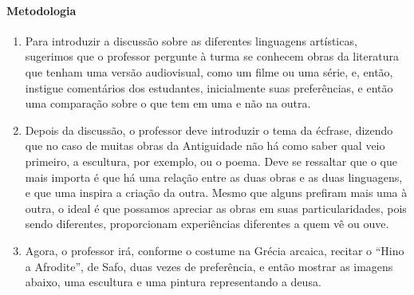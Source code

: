 \documentclass[12pt]{extarticle}
\begin{document}

\paragraph{Metodologia} 

\begin{enumerate}
\item
Para introduzir a discussão sobre as diferentes linguagens artísticas, sugerimos
que o professor pergunte à turma se conhecem obras da literatura que tenham
uma versão audiovisual, como um filme ou uma série, e, então, instigue comentários
dos estudantes, inicialmente suas preferências, e então uma comparação sobre o que
tem em uma e não na outra. 

\item
Depois da discussão, o professor deve introduzir o tema da écfrase, dizendo que
no caso de muitas obras da Antiguidade não há como saber qual veio primeiro,
a escultura, por exemplo, ou o poema. Deve se ressaltar que o que mais importa
é que há uma relação entre as duas obras e as duas linguagens, e que uma inspira
a criação da outra. Mesmo que alguns prefiram mais uma à outra, o ideal é que 
possamos apreciar as obras em suas particularidades, pois sendo diferentes, 
proporcionam experiências diferentes a quem vê ou ouve. 

\item
Agora, o professor irá, conforme o costume na Grécia arcaica, recitar o ``Hino
a Afrodite'', de Safo, duas vezes de preferência, e então mostrar as imagens
abaixo, uma escultura e uma pintura representando a deusa. 


\end{enumerate}
\end{document}
